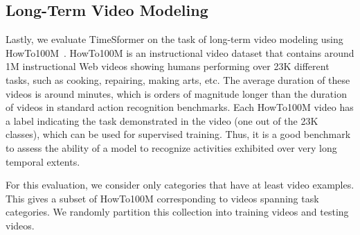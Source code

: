 \documentclass{article}
\begin{document}
\subsection{Long-Term Video Modeling}
\label{long_sec}


Lastly, we evaluate TimeSformer on the task of long-term video modeling using HowTo100M~\cite{miech19howto100m}. HowTo100M is an instructional video dataset that contains around 1M instructional Web videos showing humans performing over 23K different tasks, such as cooking, repairing, making arts, etc. The average duration of these videos is around  minutes, which is orders of magnitude longer than the duration of videos in standard action recognition benchmarks. Each HowTo100M video has a label indicating the task demonstrated in the video (one out of the 23K classes), which can be used for supervised training. Thus, it is a good benchmark to assess the ability of a model to recognize activities exhibited over very long temporal extents.



For this evaluation, we consider only categories that have at least  video examples. This gives a subset of HowTo100M corresponding to  videos spanning  task categories. We randomly partition this collection into  training videos and  testing videos. 
\end{document}
